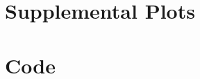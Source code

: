 \documentclass[12pt]{article}
\begin{document}
\appendix
\onecolumn
\section{Supplemental Plots}
\section{Code}





\end{document}
